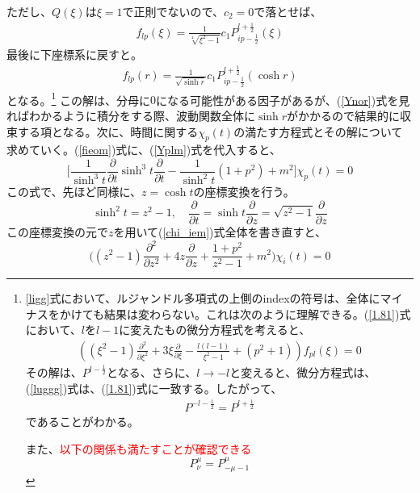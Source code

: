 ただし、$Q(\xi)$は$\xi=1$で正則でないので、$c_2=0$で落とせば、
\begin{align}
  f_{lp}(\xi)=\frac{1}{\sqrt[4]{\xi^2-1}}c_1 P_{i p-\frac{1}{2}}^{l+\frac{1}{2}}(\xi)
\end{align}
最後に下座標系に戻すと。
\begin{align}
  \label{lugg}
  f_{lp}(r)=\frac{1}{\sqrt{\sinh r}}c_1 P_{i p-\frac{1}{2}}^{l+\frac{1}{2}}(\cosh r)
\end{align}
となる。\footnote{\ref{ligg}式において、ルジャンドル多項式の上側のindexの符号は、全体にマイナスをかけても結果は変わらない。これは次のように理解できる。(\ref{1.81})式において、$l$を$l-1$に変えたもの微分方程式を考えると、
\begin{align}
\label{luggg}
\left(\left(\xi^2-1\right)\frac{\partial^2}{\partial \xi^2}+3 \xi \frac{\partial}{\partial \xi}-\frac{l (l-1)}{\xi^2-1}+(p^2+1)\right)f_{pl}(\xi)=0
\end{align}
その解は、$P^{l-\frac{1}{2}}$となる、さらに、$l\to-l$と変えると、微分方程式は、(\ref{luggg})式は、(\ref{1.81})式に一致する。したがって、
\begin{align}
  P^{-l-\frac{1}{2}}=P^{l+\frac{1}{2}}
\end{align}
であることがわかる。

また、\textcolor{red}{以下の関係も満たすことが確認できる}
\begin{equation}
  P^{\mu}_{\nu}=P^{\mu}_{-\mu-1}
\end{equation}
}
この解は、分母に$0$になる可能性がある因子があるが、(\ref{Ynor})式を見ればわかるように積分をする際、波動関数全体に$\sinh r$がかかるので結果的に収束する項となる。次に、時間に関する$\chi_p(t)$の満たす方程式とその解について求めていく。(\ref{fieom})式に、(\ref{Yplm})式を代入すると、
\begin{equation}
  \label{chi_iem}
   \biggl[\frac{1}{\sinh^3t}\frac{\partial}{\partial t}\sinh^3t\frac{\partial}{\partial t}-\frac{1}{\sinh^2t}(1+p^2)+m^2\biggr]\chi_p(t)=0
\end{equation}
この式で、先ほど同様に、$z = \cosh t$の座標変換を行う。
\begin{equation}
  \sinh^2 t=z^2 -1 ,\quad \frac{\partial}{\partial t}=\sinh t\frac{\partial}{\partial z}=\sqrt{z^2-1}\frac{\partial}{\partial z}
\end{equation}
この座標変換の元で$z$を用いて(\ref{chi_iem})式全体を書き直すと、
\begin{equation}
  \biggl((z^2-1)\frac{\partial^2}{\partial z^2}+4z \frac{\partial}{\partial z}+\frac{1+p^2}{z^2-1}+m^2\biggr)\chi_i(t)=0
\end{equation}
